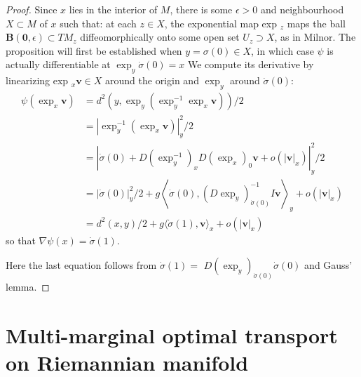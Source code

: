 \begin{proof}
	Since \( x \) lies in the interior of \( M \), there is some \( \epsilon > 0 \) and neighbourhood \( X \subset M \) of \( x \) such that: at each \( z \in X \), the exponential map exp \( _ { z } \) maps
	the ball \( \mathbf { B } ( \mathbf { 0 } , \epsilon ) \subset T M _ { z } \) diffeomorphically onto some open set \( U _ { z } \supset X \), as in Milnor.
	The proposition will first be established when
	\( y = \sigma ( 0 ) \in X \), in which case \( \psi \) is actually differentiable at \( \exp _ { y } \dot { \sigma } ( 0 ) = x \)
	We compute its derivative by linearizing exp \( _ { x } \mathbf { v } \in X \) around the origin and $\exp _ { y }$ around $ \dot { \sigma } ( 0 )$:
	\begin{align*}
		\psi \left( \exp _ { x } \mathbf { v } \right) & = d ^ { 2 } \left( y , \exp _ { y } \left( \exp _ { y } ^ { - 1 } \exp _ { x } \mathbf { v } \right) \right) / 2 \\ & = \left| \exp _ { y } ^ { - 1 } \left( \exp _ { x } \mathbf { v } \right) \right| _ { y } ^ { 2 } / 2 \\ & = \left| \dot { \sigma } ( 0 ) + D \left( \exp _ { y } ^ { - 1 } \right) _ { x } D \left( \exp _ { x } \right) _ { 0 } \mathbf { v } + o \left( | \mathbf { v } | _ { x } \right) \right| _ { y } ^ { 2 } / 2 \\ & = | \dot { \sigma } ( 0 ) | _ { y } ^ { 2 } / 2 + g \left\langle \dot { \sigma } ( 0 ) , \left( D \exp _ { y } \right) _ { \dot { \sigma } ( 0 ) } ^ { - 1 } I \mathbf { v } \right\rangle _ { y } + o \left( | \mathbf { v } | _ { x } \right) \\ & = d ^ { 2 } ( x , y ) / 2 + g \langle \dot { \sigma } ( 1 ) , \mathbf { v } \rangle _ { x } + o \left( | \mathbf { v } | _ { x } \right)
	\end{align*}
	so that \( \nabla \psi ( x ) = \dot { \sigma } ( 1 )\).

	Here the last equation follows from \( \dot { \sigma } ( 1 ) = \)
	\( D \left( \exp _ { y } \right) _ { \dot { \sigma } ( 0 ) } \dot { \sigma } ( 0 ) \) and Gauss' lemma.
\end{proof}

\section{Multi-marginal optimal transport on Riemannian manifold}

